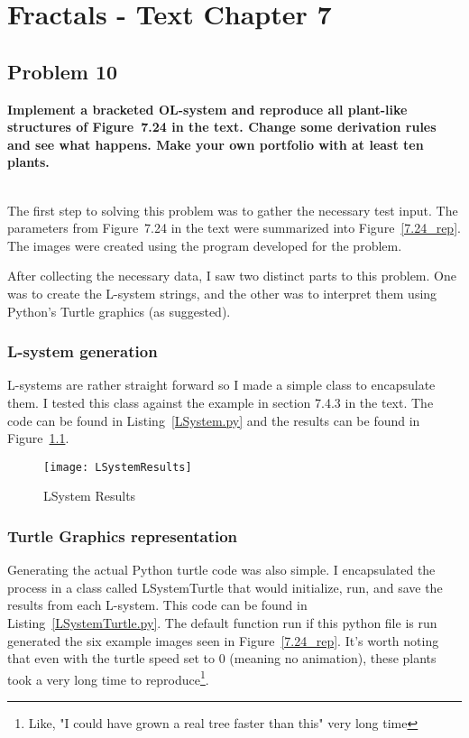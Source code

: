 
\chapter{Fractals - Text Chapter 7}

\section{Problem 10}
\textbf{
Implement a bracketed OL-system and reproduce all plant-like structures of Figure~7.24 in the text. Change some derivation rules and see what happens. Make your own portfolio with at least ten plants.
}

\hfill \\

The first step to solving this problem was to gather the necessary test input. The parameters from Figure~7.24 in the text were summarized into Figure~\ref{7.24_rep}. The images were created using the program developed for the problem.

After collecting the necessary data, I saw two distinct parts to this problem. One was to create the L-system strings, and the other was to interpret them using Python's Turtle graphics (as suggested).

\subsection{L-system generation}
L-systems are rather straight forward so I made a simple class to encapsulate them. I tested this class against the example in section 7.4.3 in the text. The code can be found in Listing~\ref{LSystem.py} and the results can be found in Figure~\ref{lsystem_results}.

\begin{figure}
\centering
\texttt{[image: LSystemResults]}
\caption{LSystem Results}
\label{lsystem_results}
\end{figure}


\subsection{Turtle Graphics representation}
Generating the actual Python turtle code was also simple. I encapsulated the process in a class called LSystemTurtle that would initialize, run, and save the results from each L-system. This code can be found in Listing~\ref{LSystemTurtle.py}. The default function run if this python file is run generated the six example images seen in Figure~\ref{7.24_rep}. It's worth noting that even with the turtle speed set to 0 (meaning no animation), these plants took a very long time to reproduce\footnote{Like, "I could have grown a real tree faster than this" very long time}.

